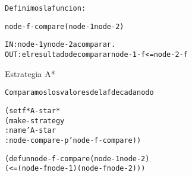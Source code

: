 \begin{aibox}{\function}
\begin{alltt}
Definimos la funcion:

node-f-compare (node-1 node-2)

IN:     node-1 y node-2 a comparar.
OUT: 	el resultado de comparar node-1-f <= node-2-f

\end{alltt}
\end{aibox}

\begin{aibox}{\examples}
\begin{alltt}
\end{alltt}
\end{aibox}

\begin{aibox}{\comments}
Estrategia A*

\end{aibox}

\begin{aibox}{\pseudocode}
\begin{alltt}

    Comparamos los valores de la f de cada nodo

\end{alltt}
\end{aibox}

\begin{aibox}{\code}
\begin{alltt}
(setf *A-star*
    (make-strategy 
        :name 'A-star
        :node-compare-p 'node-f-compare))

(defun node-f-compare (node-1 node-2)
    (<= (node-f node-1) (node-f node-2)))

\end{alltt}
\end{aibox}
